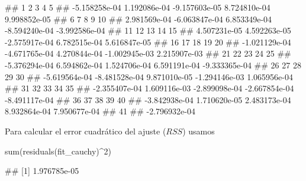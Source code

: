 \documentclass[
  title=normal,
  notoc,
  bib=normal]{mnye}
\newenvironment{Shaded}{\begin{snugshade}}{\end{snugshade}}
\newcommand{\DecValTok}[1]{\textcolor[rgb]{0.00,0.00,0.81}{#1}}
\newcommand{\FunctionTok}[1]{\textcolor[rgb]{0.00,0.00,0.00}{#1}}
\newcommand{\NormalTok}[1]{#1}
\newcommand{\SpecialCharTok}[1]{\textcolor[rgb]{0.00,0.00,0.00}{#1}}
\begin{document}
\begin{Shaded}
\begin{Highlighting}[]
\NormalTok{\#\#             1             2             3             4             5 }
\NormalTok{\#\# {-}5.158258e{-}04  1.192086e{-}04 {-}9.157603e{-}05  8.724810e{-}04  9.998852e{-}05 }
\NormalTok{\#\#             6             7             8             9            10 }
\NormalTok{\#\#  2.981569e{-}04 {-}6.063847e{-}04  6.853349e{-}04 {-}8.594240e{-}04 {-}3.992586e{-}04 }
\NormalTok{\#\#            11            12            13            14            15 }
\NormalTok{\#\#  4.507231e{-}05  4.592263e{-}05 {-}2.575917e{-}04  6.782515e{-}04  5.616847e{-}05 }
\NormalTok{\#\#            16            17            18            19            20 }
\NormalTok{\#\# {-}1.021129e{-}04 {-}4.671765e{-}04  4.270844e{-}04 {-}1.002945e{-}03  2.215907e{-}03 }
\NormalTok{\#\#            21            22            23            24            25 }
\NormalTok{\#\# {-}5.376294e{-}04  6.594862e{-}04  1.524706e{-}04  6.591191e{-}04 {-}9.333365e{-}04 }
\NormalTok{\#\#            26            27            28            29            30 }
\NormalTok{\#\# {-}5.619564e{-}04 {-}8.481528e{-}04  9.871010e{-}05 {-}1.294146e{-}03  1.065956e{-}04 }
\NormalTok{\#\#            31            32            33            34            35 }
\NormalTok{\#\# {-}2.355407e{-}04  1.609116e{-}03 {-}2.899098e{-}04 {-}2.667854e{-}04 {-}8.491117e{-}04 }
\NormalTok{\#\#            36            37            38            39            40 }
\NormalTok{\#\# {-}3.842938e{-}04  1.710620e{-}05  2.483173e{-}04  8.932864e{-}04  7.950677e{-}04 }
\NormalTok{\#\#            41 }
\NormalTok{\#\# {-}2.796932e{-}04}
\end{Highlighting}
\end{Shaded}

Para calcular el error cuadrático del ajuste (\(RSS\)) usamos

\begin{Shaded}
\begin{Highlighting}[]
\FunctionTok{sum}\NormalTok{(}\FunctionTok{residuals}\NormalTok{(fit\_cauchy)}\SpecialCharTok{\^{}}\DecValTok{2}\NormalTok{)}
\end{Highlighting}
\end{Shaded}

\begin{Shaded}
\begin{Highlighting}[]
\NormalTok{\#\# [1] 1.976785e{-}05}
\end{Highlighting}
\end{Shaded}
\end{document}

